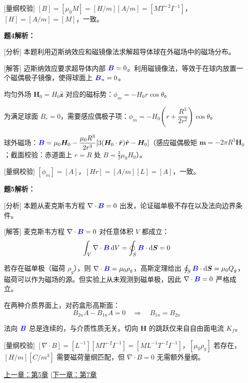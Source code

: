 \documentclass[11pt,a4paper,openany,oneside]{book}
\newcommand{\diff}{\mathrm{d}}
\newcommand{\vecB}{\textcolor{blue}{\vect{B}}}
\newcommand{\muz}{\mu_0}
\newcommand{\vect}[1]{\bm{#1}}
\newcommand{\unitvec}[1]{\hat{\vect{#1}}}
\newcommand{\divg}{\nabla\cdot}
\begin{document}
[量纲校验] $[B] = [\muz M] = [H/m][A/m] = [MT^{-2}I^{-1}]$，$[H] = [A/m] = [M]$，一致。\qedsymbol

\textbf{题4解析：}

[分析] 本题利用迈斯纳效应和磁镜像法求解超导体球在外磁场中的磁场分布。

[解答] 迈斯纳效应要求超导体内部 $\vecB = 0$。利用磁镜像法，等效于在球内放置一个磁偶极子镜像，使得球面上 $\vecB_n = 0$。

均匀外场 $\vect{H}_0 = H_0\unitvec{z}$ 对应的磁标势：$\phi_m = -H_0 r\cos\theta$。

为满足球面 $B_r = 0$，需要感应偶极子项：$\phi_m = -H_0\left(r + \dfrac{R^3}{2r^2}\right)\cos\theta$。

球外磁场：$\vecB = \muz\vect{H}_0 - \dfrac{\muz R^3}{2r^3}[3(\vect{H}_0\cdot\unitvec{r})\unitvec{r} - \vect{H}_0]$（感应磁偶极矩 $\vect{m} = -2\pi R^3\vect{H}_0$；截面校验：赤道面上 $r=R$ 处 $B = \frac{3}{2}\muz H_0$）。\qedsymbol

[量纲校验] $[\phi_m] = [A]$，$[Hr] = [A/m][L] = [A]$，一致。\qedsymbol

\textbf{题5解析：}

[分析] 本题从麦克斯韦方程 $\divg\vecB = 0$ 出发，论证磁单极不存在以及法向边界条件。

[解答] 麦克斯韦方程 $\divg\vecB = 0$ 对任意体积 $V$ 都成立：
\[
\int_V \divg\vecB\,\diff V = \oint_S \vecB\cdot\diff\vect{S} = 0
\]

若存在磁单极（磁荷 $\rho_g$），则 $\divg\vecB = \mu_0\rho_g$，高斯定理给出 $\oint_S \vecB\cdot\diff\vect{S} = \mu_0 Q_g$，磁荷可以作为磁场的源。但实验上从未观测到磁单极，因此 $\divg\vecB = 0$ 严格成立。

在两种介质界面上，对药盒形高斯面：
\[
B_{2n}A - B_{1n}A = 0 \quad\Rightarrow\quad B_{1n} = B_{2n}
\]

法向 $\vecB$ 总是连续的，与介质性质无关。切向 $\vect{H}$ 的跳跃仅来自自由面电流 $K_f$。\qedsymbol

[量纲校验] $[\divg B] = [L^{-1}][MT^{-2}I^{-1}] = [ML^{-1}T^{-2}I^{-1}]$，$[\mu_0\rho_g]$ 若存在，$[H/m][C/m^3]$ 需要磁荷量纲匹配，但 $\divg B = 0$ 无需额外量纲。\qedsymbol





\begin{center}\small \hyperlink{ch5-goal}{上一章：第5章} \quad|\quad \hyperlink{ch7-goal}{下一章：第7章}\end{center}
\end{document}
